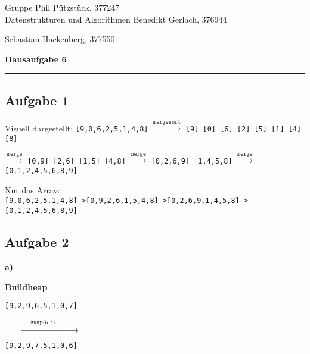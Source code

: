 \documentclass[a4paper,graphics,11pt]{article}
\newcommand{\aufgabe}[1]{\subsection*{Aufgabe #1}}
\begin{document}
\noindent Gruppe              \hfill Phil Pützstück, 377247\\
\noindent Datenstrukturen und Algorithmen \hfill Benedikt Gerlach, 376944\\
\strut\hfill Sebastian Hackenberg, 377550\\
\begin{center}
	\LARGE{\textbf{Hausaufgabe 6}}
\end{center}
\begin{center}
\rule[0.1ex]{\textwidth}{1pt}
\end{center}

\aufgabe{1}
Visuell dargestellt:
\texttt{[9,0,6,2,5,1,4,8]} $\xrightarrow{\texttt{mergesort}}$
\texttt{[9] [0] [6] [2] [5] [1] [4] [8]}

$\xrightarrow{\texttt{merge}}$ \texttt{[0,9] [2,6] [1,5] [4,8]}
$\xrightarrow{\texttt{merge}}$ \texttt{[0,2,6,9] [1,4,5,8]}
$\xrightarrow{\texttt{merge}}$ \texttt{[0,1,2,4,5,6,8,9]}

Nur das Array:\\
\texttt{[9,0,6,2,5,1,4,8]->[0,9,2,6,1,5,4,8]->[0,2,6,9,1,4,5,8]->[0,1,2,4,5,6,8,9]}

\aufgabe{2}
\textbf{a)}

\textbf{Buildheap}

\begin{minipage}{0.3\textwidth}
    \texttt{[9,2,9,6,5,1,0,7]}
\end{minipage}
$\xrightarrow{\qquad\qquad\texttt{swap(6,7)}\qquad\qquad}$
\begin{minipage}{0.3\textwidth}
    \texttt{[9,2,9,7,5,1,0,6]}
\end{minipage}
\end{document}
